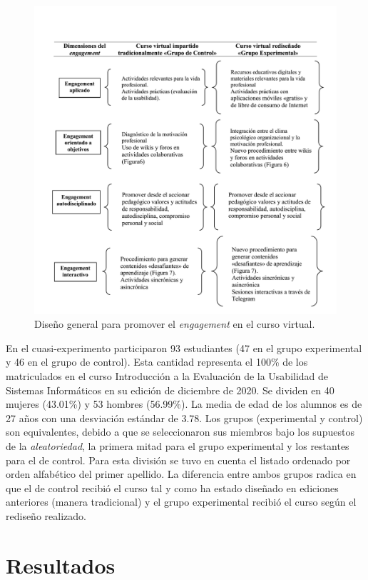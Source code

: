 \documentclass{textolivre}
\begin{document}
\begin{figure}[htbp]
 \centering
 \includegraphics[width=1\textwidth]{fig3.png}
 \caption{Diseño general para promover el \emph{engagement} en el curso virtual.}
 \label{fig3}
\end{figure}

En el cuasi-experimento participaron 93 estudiantes (47 en el grupo experimental y 46 en el grupo de control). Esta cantidad representa el 100\% de los matriculados en el curso Introducción a la Evaluación de la Usabilidad de Sistemas Informáticos en su edición de diciembre de 2020. Se dividen en 40 mujeres (43.01\%) y 53 hombres (56.99\%). La media de edad de los alumnos es de 27 años con una desviación estándar de 3.78. Los grupos (experimental y control) son equivalentes, debido a que se seleccionaron sus miembros bajo los supuestos de la \emph{aleatoriedad}, la primera mitad para el grupo experimental y los restantes para el de control. Para esta división se tuvo en cuenta el listado ordenado por orden alfabético del primer apellido. La diferencia entre ambos grupos radica en que el de control recibió el curso tal y como ha estado diseñado en ediciones anteriores (manera tradicional) y el grupo experimental recibió el curso según el rediseño realizado.

\section{Resultados}
\end{document}
